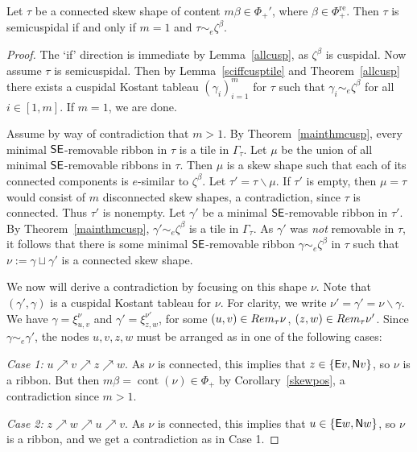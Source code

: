 \documentclass[Unicode,ALCO]{cedram}
\newcommand{\0}{{\bar 0}}
\newcommand{\no}{{\sf N}}
\newcommand{\ea}{{\sf E}}
\newcommand{\ssee}{{\sf SE}}
\def\cont{{\operatorname{cont}}}
\def\re{{\mathrm{re}}}
\begin{document}
\begin{lemma}\label{conscreal}
Let \(\tau\) be a connected skew shape of content \(m \beta \in \Phi_+'\), where \(\beta \in \Phi_+^\re\). Then \(\tau\) is semicuspidal if and only if \(m=1\) and \(\tau \sim_e \zeta^\beta\).
\end{lemma}
\begin{proof}
The `if' direction is immediate by Lemma~\ref{allcusp}, as \(\zeta^\beta\) is cuspidal. Now assume \(\tau\) is semicuspidal. Then by Lemma~\ref{sciffcusptile} and Theorem~\ref{allcusp} there exists a cuspidal Kostant tableau \((\gamma_i)_{i=1}^m\) for \(\tau\) such that \(\gamma_i \sim_e \zeta^\beta\) for all \(i \in [1,m]\). If \(m=1\), we are done.

Assume by way of contradiction that \(m>1\).
By Theorem~\ref{mainthmcusp}, every minimal \(\ssee\)-removable ribbon in \(\tau\) is a tile in \(\Gamma_\tau\). Let \(\mu\) be the union of all minimal \(\ssee\)-removable ribbons in \(\tau\). Then \(\mu\) is a skew shape such that each of its connected components is \(e\)-similar to \(\zeta^\beta\). Let \(\tau' = \tau \backslash \mu\). If \(\tau'\) is empty, then \(\mu = \tau\) would consist of \(m\) disconnected skew shapes, a contradiction, since \(\tau\) is connected. Thus \(\tau'\) is nonempty. Let \(\gamma'\) be a minimal \(\ssee\)-removable ribbon in \(\tau'\). By Theorem~\ref{mainthmcusp}, \(\gamma' \sim_e \zeta^\beta\) is a tile in \(\Gamma_\tau\). As \(\gamma'\) was {\em not} removable in \(\tau\), it follows that there is some minimal \(\ssee\)-removable ribbon \(\gamma \sim_e \zeta^\beta\) in \(\tau\) such that \(\nu:=\gamma \sqcup \gamma'\) is a connected skew shape.


We now will derive a contradiction by focusing on this shape \(\nu\). 
Note that \((\gamma', \gamma)\) is a cuspidal Kostant tableau for \(\nu\).
For clarity, we write \(\nu' = \gamma' = \nu \backslash \gamma\). 
We have \(\gamma = \xi^\nu_{u,v}\) and \(\gamma' = \xi^{\nu'}_{z,w}\), for some \((u,v) \in \textup{Rem}_\tau{\nu}\), \((z,w) \in \textup{Rem}_\tau{\nu'}\). Since \(\gamma \sim_e \gamma'\), the nodes \(u,v,z,w\) must be arranged as in one of the following cases:

{\em Case 1:} \(u \nearrow v \nearrow z \nearrow w\). As \(\nu\) is connected, this implies that \(z \in \{\ea v, \no v\}\), so \(\nu\) is a ribbon. But then \(m \beta = \cont(\nu) \in \Phi_+\) by Corollary~\ref{skewpos}, a contradiction since \(m >1\).

{\em Case 2:} \(z \nearrow w \nearrow u \nearrow v\). As \(\nu\) is connected, this implies that \(u \in \{\ea w, \no w\}\), so \(\nu\) is a ribbon, and we get a contradiction as in Case 1.


\end{proof}
\end{document}

